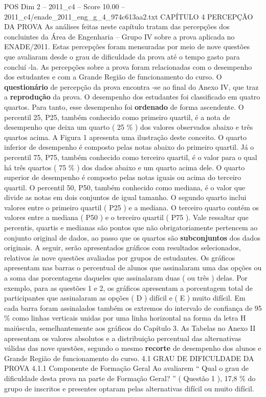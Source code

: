 \begin{textsample}{POS Dim 2 – 2011\_c4 – Score 10.00 – 2011\_c4/enade\_2011\_eng\_g\_4\_974c613aa2.txt}  \label{ex:f2_pos_121}
CAPÍTULO 4 PERCEPÇÃO DA PROVA As análises feitas neste capítulo tratam das percepções dos concluintes da Área de Engenharia – Grupo IV sobre a prova aplicada no ENADE/2011.
Estas percepções foram mensuradas por meio de nove questões que avaliaram desde o grau de dificuldade da prova até o tempo gasto para concluí -la.
As percepções sobre a prova foram relacionadas com o desempenho dos estudantes e com a Grande Região de funcionamento do curso.
O \textbf{questionário} de percepção da prova encontra -se ao final do Anexo IV, que traz a \textbf{reprodução} da prova.
O desempenho dos estudantes foi classificado em quatro quartos.
Para tanto, esse desempenho foi \textbf{ordenado} de forma ascendente.
O percentil 25, P25, também conhecido como primeiro quartil, é a nota de desempenho que deixa um quarto ( 25 \% ) dos valores observados abaixo e três quartos acima.
A Figura 1 apresenta uma ilustração deste conceito.
O quarto inferior de desempenho é composto pelas notas abaixo do primeiro quartil.
Já o percentil 75, P75, também conhecido como terceiro quartil, é o valor para o qual há três quartos ( 75 \% ) dos dados abaixo e um quarto acima dele.
O quarto superior de desempenho é composto pelas notas iguais ou acima do terceiro quartil.
O percentil 50, P50, também conhecido como mediana, é o valor que divide as notas em dois conjuntos de igual tamanho.
O segundo quarto inclui valores entre o primeiro quartil ( P25 ) e a mediana.
O terceiro quarto contém os valores entre a mediana ( P50 ) e o terceiro quartil ( P75 ).
Vale ressaltar que percentis, quartis e medianas são pontos que não obrigatoriamente pertencem ao conjunto original de dados, ao passo que os quartos são \textbf{subconjuntos} dos dados originais.
A seguir, serão apresentados gráficos com resultados selecionados, relativos às nove questões avaliadas por grupos de estudantes.
Os gráficos apresentam nas barras o percentual de alunos que assinalaram uma das opções ou a soma das porcentagens daqueles que assinalaram duas ( ou três ) delas.
Por exemplo, para as questões 1 e 2, os gráficos apresentam a porcentagem total de participantes que assinalaram as opções ( D ) difícil e ( E ) muito difícil.
Em cada barra foram assinalados também os extremos do intervalo de confiança de 95 \% como linhas verticais unidas por uma linha horizontal na forma da letra H maiúscula, semelhantemente aos gráficos do Capítulo 3.
As Tabelas no Anexo II apresentam os valores absolutos e a distribuição percentual das alternativas válidas das nove questões, segundo o mesmo \textbf{recorte} de desempenho dos alunos e Grande Região de funcionamento do curso. 4.1 GRAU DE DIFICULDADE DA PROVA 4.1.1 Componente de Formação Geral Ao avaliarem “ Qual o grau de dificuldade desta prova na parte de Formação Geral? ” ( Questão 1 ), 17,8 \% do grupo de inscritos e presentes optaram pelas alternativas difícil ou muito difícil.

\end{textsample}
